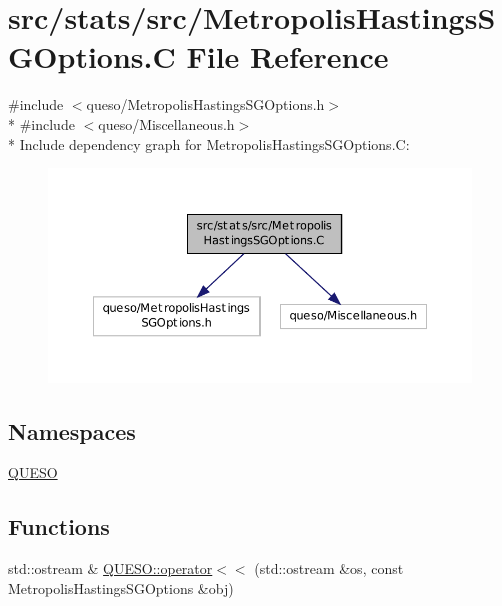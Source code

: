 \hypertarget{_metropolis_hastings_s_g_options_8_c}{\section{src/stats/src/\-Metropolis\-Hastings\-S\-G\-Options.C File Reference}
\label{_metropolis_hastings_s_g_options_8_c}
}
{\ttfamily \#include $<$queso/\-Metropolis\-Hastings\-S\-G\-Options.\-h$>$}\\*
{\ttfamily \#include $<$queso/\-Miscellaneous.\-h$>$}\\*
Include dependency graph for Metropolis\-Hastings\-S\-G\-Options.\-C\-:
\nopagebreak
\begin{figure}[H]
\begin{center}
\leavevmode
\includegraphics[width=350pt]{_metropolis_hastings_s_g_options_8_c__incl}
\end{center}
\end{figure}
\subsection*{Namespaces}
\begin{DoxyCompactItemize}
\item 
\hyperlink{namespace_q_u_e_s_o}{Q\-U\-E\-S\-O}
\end{DoxyCompactItemize}
\subsection*{Functions}
\begin{DoxyCompactItemize}
\item 
std\-::ostream \& \hyperlink{namespace_q_u_e_s_o_ab4def712856f22b50e34d21ef9093ac1}{Q\-U\-E\-S\-O\-::operator$<$$<$} (std\-::ostream \&os, const Metropolis\-Hastings\-S\-G\-Options \&obj)
\end{DoxyCompactItemize}
